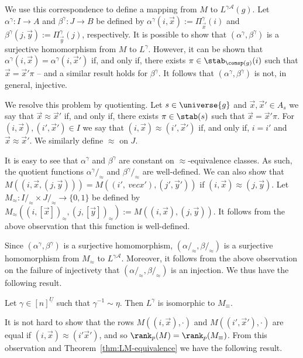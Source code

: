 \documentclass[a4paper,UKenglish]{lipics-v2018}
\begin{document}
We use this correspondence to define a mapping from $M$ to $L^{\gamma
  \mathcal{A}}(g)$. Let $\alpha^{\gamma}: I \rightarrow A$ and $\beta^{\gamma}:
J \rightarrow B$ be defined by $\alpha^{\gamma} (i, \vec{x}) :=
\Pi^{\gamma}_{\vec{x}}(i)$ and $\beta^{\gamma} (j, \vec{y}) :=
\Pi^{\gamma}_{\vec{y}}(j)$, respectively. It is possible to show that
$(\alpha^{\gamma}, \beta^{\gamma})$ is a surjective homomorphism from $M$ to
$L^{\gamma}$. However, it can be shown that $\alpha^{\gamma}(i, \vec{x}) =
\alpha^{\gamma}(i, \vec{x}')$ if, and only if, there exists $\pi \in
\stab_{\consp(g)}(i)$ such that $\vec{x} = \vec{x}' \pi$ -- and a similar result
holds for $\beta^{\gamma}$. It follows that $(\alpha^{\gamma}, \beta^{\gamma})$
is not, in general, injective.

We resolve this problem by quotienting. Let $s \in \universe{g}$ and $\vec{x},
\vec{x}' \in A_s$ we say that $\vec{x} \approx \vec{x}'$ if, and only if, there
exists $\pi \in \stab(s)$ such that $\vec{x} = \vec{x}' \pi$. For $(i, \vec{x}),
(i', \vec{x}') \in I$ we say that $(i, \vec{x}) \approx (i', \vec{x}')$ if, and
only if, $i = i'$ and $\vec{x} \approx \vec{x}'$. We similarly define $\approx$
on $J$.

It is easy to see that $\alpha^{\gamma}$ and $\beta^{\gamma}$ are constant on
$\approx$-equivalence classes. As such, the quotient functions $\alpha^\gamma
/_\approx$ and $\beta^{\gamma} /_\approx$ are well-defined. We can also show
that $M((i, \vec{x}, (j, \vec{y}))) = M((i',\ vec{x}'), (j', \vec{y}'))$ if $(i,
\vec{x}) \approx (j, \vec{y})$. Let $M_{\approx} : I /_{\approx} \times J
/_\approx \rightarrow \{0,1\}$ be defined by $M_\approx ((i, [\vec{x}])_\approx,
(j, [\vec{y}])_\approx) := M((i,\vec{x}), (j, \vec{y}))$. It follows from the
above observation that this function is well-defined.

Since $(\alpha^{\gamma}, \beta^{\gamma})$ is a surjective homomorphism, $(\alpha
/_\approx, \beta /_\approx)$ is a surjective homomorphism from $M_\approx$ to
$L^{\gamma \mathcal{A}}$. Moreover, it follows from the above observation on the
failure of injectivety that $(\alpha /_\approx, \beta /_\approx)$ is an
injection. We thus have the following result.

\begin{theorem}
	Let $\gamma \in [n]^{\underline{U}}$ such that $\gamma^{-1} \sim \eta$. Then
  $L^{\gamma}$ is isomorphic to $M_{\equiv}$.
	\label{thm:LM-equivalence}
\end{theorem}

It is not hard to show that the rows $M ((i, \vec{x}), \cdot)$ and $M((i',
\vec{x}'), \cdot)$ are equal if $(i, \vec{x}) \approx (i' \vec{x}')$, and so
$\rank_p (M) = \rank_p(M_\equiv)$. From this observation and
Theorem~\ref{thm:LM-equivalence} we have the following result.
\end{document}

